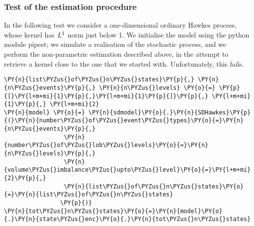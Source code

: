 \documentclass[10pt, article,table]{article}
\begin{document}
\subsubsection{Test of the estimation procedure}
In the following test we consider a one-dimensional ordinary Hawkes process, whose kernel has  $L^{1}$ norm just below 1.
We initialise the model using the python module pipest; we simulate a realisation of the stochastic process, and we perform the non-parametric estimation described above, in the attempt to retrieve a kernel close to the one that we started with. Unfortunately, this fails.

\begin{tcolorbox}[breakable, size=fbox, boxrule=1pt, pad at break*=1mm,colback=cellbackground, colframe=cellborder]
\begin{Verbatim}[commandchars=\\\{\}]
\PY{n}{list\PYZus{}of\PYZus{}n\PYZus{}states}\PY{p}{,} \PY{n}{n\PYZus{}events}\PY{p}{,} \PY{n}{n\PYZus{}levels} \PY{o}{=} \PY{p}{[}\PY{l+m+mi}{1}\PY{p}{,}\PY{l+m+mi}{1}\PY{p}{]}\PY{p}{,} \PY{l+m+mi}{1}\PY{p}{,} \PY{l+m+mi}{2}
\PY{n}{model} \PY{o}{=} \PY{n}{sdmodel}\PY{o}{.}\PY{n}{SDHawkes}\PY{p}{(}\PY{n}{number\PYZus{}of\PYZus{}event\PYZus{}types}\PY{o}{=}\PY{n}{n\PYZus{}events}\PY{p}{,}
                 \PY{n}{number\PYZus{}of\PYZus{}lob\PYZus{}levels}\PY{o}{=}\PY{n}{n\PYZus{}levels}\PY{p}{,}
                 \PY{n}{volume\PYZus{}imbalance\PYZus{}upto\PYZus{}level}\PY{o}{=}\PY{l+m+mi}{2}\PY{p}{,}
                 \PY{n}{list\PYZus{}of\PYZus{}n\PYZus{}states}\PY{o}{=}\PY{n}{list\PYZus{}of\PYZus{}n\PYZus{}states}
                \PY{p}{)}
\PY{n}{tot\PYZus{}n\PYZus{}states}\PY{o}{=}\PY{n}{model}\PY{o}{.}\PY{n}{state\PYZus{}enc}\PY{o}{.}\PY{n}{tot\PYZus{}n\PYZus{}states}


\end{Verbatim}
\end{tcolorbox}
\end{document}
